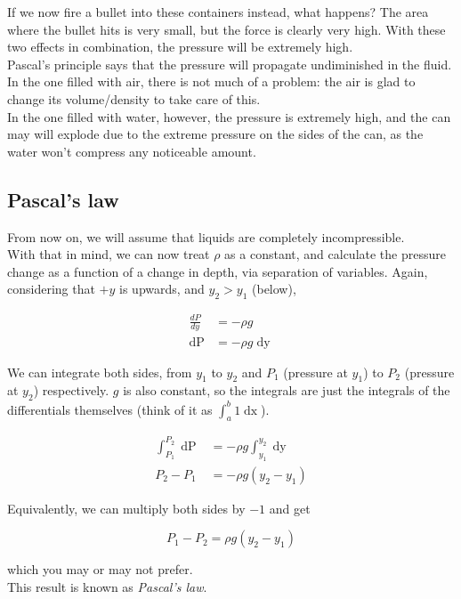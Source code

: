 If we now fire a bullet into these containers instead, what happens? The area where the bullet hits is very small, but the force is clearly very high. With these two effects in combination, the pressure will be extremely high.\\
Pascal's principle says that the pressure will propagate undiminished in the fluid.\\
In the one filled with air, there is not much of a problem: the air is glad to change its volume/density to take care of this.\\
In the one filled with water, however, the pressure is extremely high, and the can may will explode due to the extreme pressure on the sides of the can, as the water won't compress any noticeable amount.

\subsection{Pascal's law}

From now on, we will assume that liquids are completely incompressible.\\
With that in mind, we can now treat $\rho$ as a constant, and calculate the pressure change as a function of a change in depth, via separation of variables. Again, considering that $+y$ is upwards, and $y_2 > y_1$ (below),

\begin{align}
\frac{dP}{dy} &= - \rho g\\
\mathop{dP} &= - \rho g \mathop{dy}
\end{align}

We can integrate both sides, from $y_1$ to $y_2$ and $P_1$ (pressure at $y_1$) to $P_2$ (pressure at $y_2$) respectively. $g$ is also constant, so the integrals are just the integrals of the differentials themselves (think of it as $\int_a^b 1 \mathop{dx}$).

\begin{align}
\int_{P_1}^{P_2} \mathop{dP} &= - \rho g \int_{y_1}^{y_2}\mathop{dy}\\
P_2 - P_1 &= -\rho g(y_2 - y_1)
\end{align}

Equivalently, we can multiply both sides by $-1$ and get

\begin{equation}
P_1 - P_2 = \rho g(y_2 - y_1)
\end{equation}

which you may or may not prefer.\\
This result is known as \emph{Pascal's law}.


